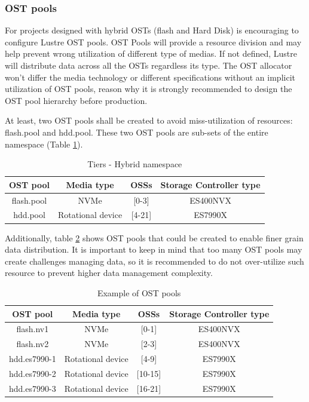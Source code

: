 \documentclass{article}
\begin{document}
\subsubsection{OST pools}
For projects designed with hybrid OSTs (flash and Hard Disk) is encouraging to configure Lustre OST pools. OST Pools will provide a resource division and may help prevent wrong utilization of different type of medias. If not defined, Lustre will distribute data across all the OSTs regardless its type. The OST allocator won't differ the media technology or different specifications without an implicit utilization of OST pools, reason why it is strongly recommended to design the OST pool hierarchy before production.

At least, two OST pools shall be created to avoid miss-utilization of resources: flash.pool and hdd.pool. These two OST pools are sub-sets of the entire namespace (Table \ref{tab:ost-pools}).

\begin{table}[h]
\centering
 \begin{tabular}{||c c c c||} 
 \hline
 OST pool & Media type & OSSs & Storage Controller type \\ [0.5ex] 
 \hline\hline
 flash.pool & NVMe & [0-3] & ES400NVX \\ 
 \hline
 hdd.pool & Rotational device & [4-21] & ES7990X\\
 \hline
 \end{tabular}
 \caption{Tiers - Hybrid namespace}
 \label{tab:ost-pools}
\end{table}

Additionally, table \ref{tab:example-ost-pools} shows OST pools that could be created to enable finer grain data distribution. It is important to keep in mind that too many OST pools may create challenges managing data, so it is recommended to do not over-utilize such resource to prevent higher data management complexity.

\begin{table}[h]
\centering
 \begin{tabular}{||c c c c||} 
 \hline
 OST pool & Media type & OSSs & Storage Controller type \\ [0.5ex] 
 \hline\hline
 flash.nv1 & NVMe & [0-1] & ES400NVX \\ 
 \hline
  flash.nv2 & NVMe & [2-3] & ES400NVX \\ 
 \hline
 hdd.es7990-1 & Rotational device & [4-9] & ES7990X\\
 \hline
  hdd.es7990-2 & Rotational device & [10-15] & ES7990X\\
 \hline
  hdd.es7990-3 & Rotational device & [16-21] & ES7990X\\
 \hline
 \end{tabular}
 \caption{Example of OST pools}
 \label{tab:example-ost-pools}
\end{table}
\end{document}
